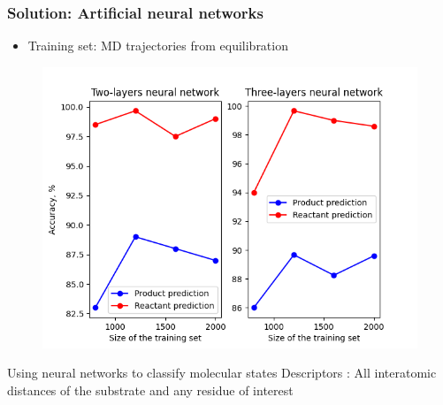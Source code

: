 \documentclass{beamer}
\begin{document}
\begin{frame}
\frametitle{Solution: Artificial neural networks}
\begin{block}{}
\begin{itemize}
\item Training set: MD trajectories from equilibration 
\end{itemize}
\end{block}
\pause
\begin{figure}
\includegraphics[scale=0.35]{figures/mbh_2waters_nn_comparison.png}
\end{figure}
Using neural networks to classify molecular states
Descriptors : All interatomic distances of the substrate and any residue of interest
\end{frame}
\end{document}
